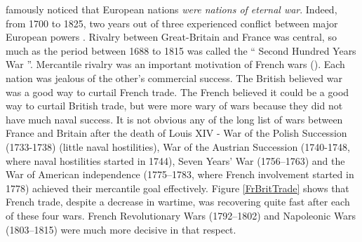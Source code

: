 \documentclass[12pt,a4paper,notitlepage]{article}
\begin{document}
\cite{jefferson_letter_1823} famously noticed that European nations \textit{were nations of eternal war}.
Indeed, from 1700 to 1825, two years out of three experienced conflict between major European powers \citep{roser_war_2016}.
Rivalry between Great-Britain and France was central, so much as the period between 1688 to 1815 was called the `` Second Hundred Years War ''.
Mercantile rivalry was an important motivation of French wars (\cite{wallerstein_modern_1980, crouzet_guerre_2008}).
Each nation was jealous of the other's commercial success.
The British believed war was a good way to curtail French trade.
The French believed it could be a good way to curtail British trade, but were more wary of wars because they did not have much naval success.
It is not obvious any of the long list of wars between France and Britain after the death of Louis XIV - War of the Polish Succession (1733-1738) (little naval hostilities), War of the Austrian Succession (1740-1748, where naval hostilities started in 1744), Seven Years' War (1756–1763) and the War of American independence (1775–1783, where French involvement started in 1778) achieved their mercantile goal effectively.
Figure \ref{FrBritTrade} shows that French trade, despite a decrease in wartime, was recovering quite fast after each of these four wars.
French Revolutionary Wars (1792–1802) and Napoleonic Wars (1803–1815) were much more decisive in that respect.
\end{document}
